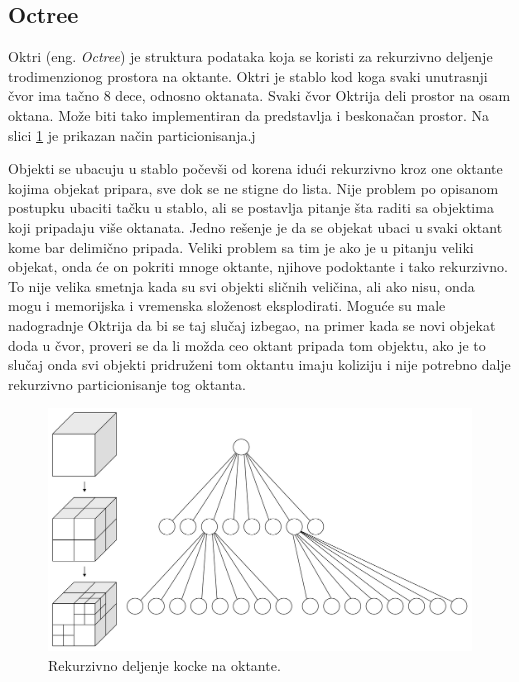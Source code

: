 \documentclass[a4paper]{article}
\begin{document}
{\subsection{Octree}
\label{subsec:octree}

Oktri (eng. {\em Octree}) je struktura podataka koja se koristi za rekurzivno deljenje trodimenzionog
prostora na oktante. Oktri je stablo kod koga svaki unutrasnji čvor ima tačno 8 dece, odnosno oktanata. 
Svaki čvor Oktrija deli prostor na osam oktana.
Može biti tako implementiran da predstavlja i beskonačan prostor.
Na slici \ref{fig:oct} je prikazan način particionisanja.j

Objekti se ubacuju u stablo počevši od korena idući rekurzivno kroz one oktante kojima objekat pripara,
sve dok se ne stigne do lista.
Nije problem po opisanom postupku ubaciti tačku u stablo, ali se postavlja pitanje šta raditi sa objektima
koji pripadaju više oktanata.
Jedno rešenje je da se objekat ubaci u svaki oktant kome bar delimično pripada. 
Veliki problem sa tim je ako je u pitanju veliki objekat, onda će on pokriti mnoge oktante, njihove 
podoktante i tako rekurzivno. To nije velika smetnja kada su svi objekti sličnih veličina, ali ako 
nisu, onda mogu i memorijska i vremenska složenost eksplodirati. 
Moguće su male nadogradnje Oktrija da bi se taj slučaj izbegao, na primer kada se novi objekat doda 
u čvor, proveri se da li možda ceo oktant pripada tom objektu, ako je to slučaj onda svi objekti pridruženi
tom oktantu imaju koliziju i nije potrebno dalje rekurzivno particionisanje tog oktanta.

\begin{figure}[h!]
	\begin{center}
	\includegraphics[scale=0.15]{octree.png}
	\end{center}
	\caption{Rekurzivno deljenje kocke na oktante.}
	\label{fig:oct}
\end{figure}



}
\end{document}
